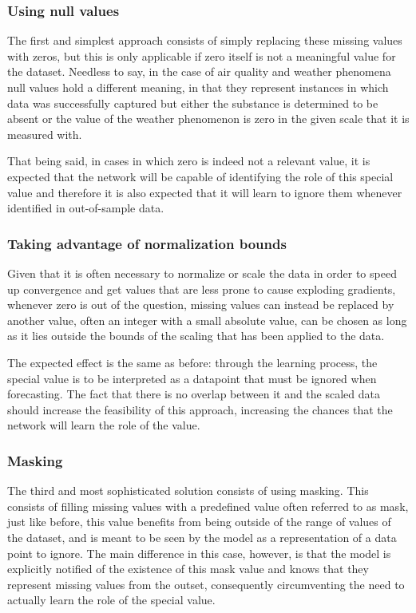 \subsubsection{Using null values}
The first and simplest approach consists of simply replacing these missing values with zeros, but this is only applicable if zero itself is not a meaningful value for the dataset. Needless to say, in the case of air quality and weather phenomena null values hold a different meaning, in that they represent instances in which data was successfully captured but either the substance is determined to be absent or the value of the weather phenomenon is zero in the given scale that it is measured with. 

That being said, in cases in which zero is indeed not a relevant value, it is expected that the network will be capable of identifying the role of this special value and therefore it is also expected that it will learn to ignore them whenever identified in out-of-sample data.
\subsubsection{Taking advantage of normalization bounds}
Given that it is often necessary to normalize or scale the data in order to speed up convergence and get values that are less prone to cause exploding gradients, whenever zero is out of the question, missing values can instead be replaced by another value, often an integer with a small absolute value, can be chosen as long as it lies outside the bounds of the scaling that has been applied to the data. 

The expected effect is the same as before: through the learning process, the special value is to be interpreted as a datapoint that must be ignored when forecasting. The fact that there is no overlap between it and the scaled data should increase the feasibility of this approach, increasing the chances that the network will learn the role of the value.

\subsubsection{Masking} \label{mask}
The third and most sophisticated solution consists of using masking. This consists of filling missing values with a predefined value often referred to as mask, just like before, this value benefits from being outside of the range of values of the dataset, and is meant to be seen by the model as a representation of a data point to ignore. The main difference in this case, however, is that the model is explicitly notified of the existence of this mask value and knows that they represent missing values from the outset, consequently circumventing the need to actually learn the role of the special value.

